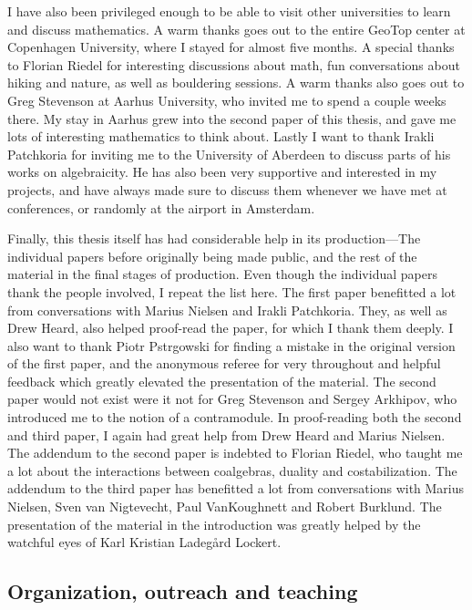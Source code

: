 I have also been privileged enough to be able to visit other universities to learn and discuss mathematics. A warm thanks goes out to the entire GeoTop center at Copenhagen University, where I stayed for almost five months. A special thanks to Florian Riedel for interesting discussions about math, fun conversations about hiking and nature, as well as bouldering sessions. A warm thanks also goes out to Greg Stevenson at Aarhus University, who invited me to spend a couple weeks there. My stay in Aarhus grew into the second paper of this thesis, and gave me lots of interesting mathematics to think about. Lastly I want to thank Irakli Patchkoria for inviting me to the University of Aberdeen to discuss parts of his works on algebraicity. He has also been very supportive and interested in my projects, and have always made sure to discuss them whenever we have met at conferences, or randomly at the airport in Amsterdam. 

Finally, this thesis itself has had considerable help in its production---The individual papers before originally being made public, and the rest of the material in the final stages of production. Even though the individual papers thank the people involved, I repeat the list here. The first paper benefitted a lot from conversations with Marius Nielsen and Irakli Patchkoria. They, as well as Drew Heard, also helped proof-read the paper, for which I thank them deeply. I also want to thank Piotr Pstr\a{}gowski for finding a mistake in the original version of the first paper, and the anonymous referee for very throughout and helpful feedback which greatly elevated the presentation of the material. The second paper would not exist were it not for Greg Stevenson and Sergey Arkhipov, who introduced me to the notion of a contramodule. In proof-reading both the second and third paper, I again had great help from Drew Heard and Marius Nielsen. The addendum to the second paper is indebted to Florian Riedel, who taught me a lot about the interactions between coalgebras, duality and costabilization. The addendum to the third paper has benefitted a lot from conversations with Marius Nielsen, Sven van Nigtevecht, Paul VanKoughnett and Robert Burklund. The presentation of the material in the introduction was greatly helped by the watchful eyes of Karl Kristian Ladegård Lockert. 


\subsection*{Organization, outreach and teaching}


